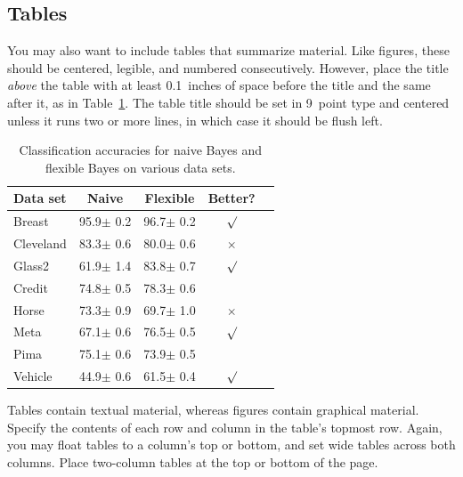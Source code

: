 \documentclass{article}
\begin{document}
\subsection{Tables}

You may also want to include tables that summarize material. Like
figures, these should be centered, legible, and numbered consecutively.
However, place the title \emph{above} the table with at least
0.1~inches of space before the title and the same after it, as in
Table~\ref{sample-table}. The table title should be set in 9~point
type and centered unless it runs two or more lines, in which case it
should be flush left.


\begin{table}[t]
\caption{Classification accuracies for naive Bayes and flexible
Bayes on various data sets.}
\label{sample-table}
\vskip 0.15in
\begin{center}
\begin{small}
\begin{sc}
\begin{tabular}{lcccr}
\toprule
Data set & Naive & Flexible & Better? \\
\midrule
Breast    & 95.9$\pm$ 0.2& 96.7$\pm$ 0.2& $\surd$ \\
Cleveland & 83.3$\pm$ 0.6& 80.0$\pm$ 0.6& $\times$\\
Glass2    & 61.9$\pm$ 1.4& 83.8$\pm$ 0.7& $\surd$ \\
Credit    & 74.8$\pm$ 0.5& 78.3$\pm$ 0.6&         \\
Horse     & 73.3$\pm$ 0.9& 69.7$\pm$ 1.0& $\times$\\
Meta      & 67.1$\pm$ 0.6& 76.5$\pm$ 0.5& $\surd$ \\
Pima      & 75.1$\pm$ 0.6& 73.9$\pm$ 0.5&         \\
Vehicle   & 44.9$\pm$ 0.6& 61.5$\pm$ 0.4& $\surd$ \\
\bottomrule
\end{tabular}
\end{sc}
\end{small}
\end{center}
\vskip -0.1in
\end{table}

Tables contain textual material, whereas figures contain graphical material.
Specify the contents of each row and column in the table's topmost
row. Again, you may float tables to a column's top or bottom, and set
wide tables across both columns. Place two-column tables at the
top or bottom of the page.


\nocite{langley00}



\end{document}
